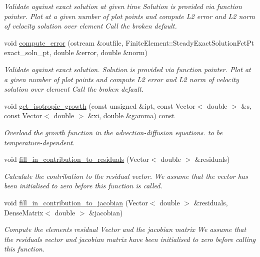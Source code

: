 \begin{DoxyCompactItemize}
\begin{DoxyCompactList}\small\item\em Validate against exact solution at given time Solution is provided via function pointer. Plot at a given number of plot points and compute L2 error and L2 norm of velocity solution over element Call the broken default. \end{DoxyCompactList}\item 
void \hyperlink{classQThermalPVDElement_abbfb260a0c8dbf1dbfa797f15d98e0af}{compute\+\_\+error} (ostream \&outfile, Finite\+Element\+::\+Steady\+Exact\+Solution\+Fct\+Pt exact\+\_\+soln\+\_\+pt, double \&error, double \&norm)
\begin{DoxyCompactList}\small\item\em Validate against exact solution. Solution is provided via function pointer. Plot at a given number of plot points and compute L2 error and L2 norm of velocity solution over element Call the broken default. \end{DoxyCompactList}\item 
void \hyperlink{classQThermalPVDElement_a25774a0b8d2a7ec688e91420527cc5c4}{get\+\_\+isotropic\+\_\+growth} (const unsigned \&ipt, const Vector$<$ double $>$ \&s, const Vector$<$ double $>$ \&xi, double \&gamma) const
\begin{DoxyCompactList}\small\item\em Overload the growth function in the advection-\/diffusion equations. to be temperature-\/dependent. \end{DoxyCompactList}\item 
void \hyperlink{classQThermalPVDElement_ab26361e4164834860ec74603276b0207}{fill\+\_\+in\+\_\+contribution\+\_\+to\+\_\+residuals} (Vector$<$ double $>$ \&residuals)
\begin{DoxyCompactList}\small\item\em Calculate the contribution to the residual vector. We assume that the vector has been initialised to zero before this function is called. \end{DoxyCompactList}\item 
void \hyperlink{classQThermalPVDElement_a6fe89466bee5ebcf16a14a68550ff447}{fill\+\_\+in\+\_\+contribution\+\_\+to\+\_\+jacobian} (Vector$<$ double $>$ \&residuals, Dense\+Matrix$<$ double $>$ \&jacobian)
\begin{DoxyCompactList}\small\item\em Compute the element\textquotesingle{}s residual Vector and the jacobian matrix We assume that the residuals vector and jacobian matrix have been initialised to zero before calling this function. \end{DoxyCompactList}\end{DoxyCompactItemize}

